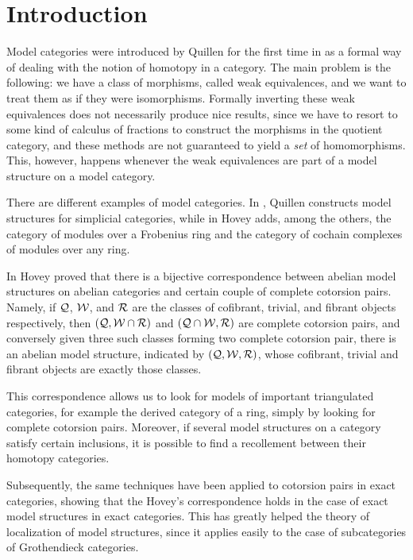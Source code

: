 \chapter*{Introduction}\label{ch:introduction}

Model categories were introduced by Quillen for the first time in \cite{Q} as a formal way of dealing with the notion of homotopy in a category. The main problem is the following: we have a class of morphisms, called weak equivalences, and we want to treat them as if they were isomorphisms. Formally inverting these weak equivalences does not necessarily produce nice results, since we have to resort to some kind of calculus of fractions to construct the morphisms in the quotient category, and these methods are not guaranteed to yield a \emph{set} of homomorphisms. This, however, happens whenever the weak equivalences are part of a model structure on a model category.

There are different examples of model categories. In \cite{Q}, Quillen constructs model structures for simplicial categories, while in \cite{Hov99} Hovey adds, among the others, the category of modules over a Frobenius ring and the category of cochain complexes of modules over any ring.

In \cite{Hov02} Hovey proved that there is a bijective correspondence between abelian model structures on abelian categories and certain couple of complete cotorsion pairs. Namely, if $\mathcal{Q}$, $\mathcal{W}$, and $\mathcal{R}$ are the classes of cofibrant, trivial, and fibrant objects respectively, then $(\mathcal{Q},\mathcal{W}\cap\mathcal{R})$ and $(\mathcal{Q}\cap\mathcal{W},\mathcal{R})$ are complete cotorsion pairs, and conversely given three such classes forming two complete cotorsion pair, there is an abelian model structure, indicated by $(\mathcal{Q},\mathcal{W},\mathcal{R})$, whose cofibrant, trivial and fibrant objects are exactly those classes.

This correspondence allows us to look for models of important triangulated categories, for example the derived category of a ring, simply by looking for complete cotorsion pairs. Moreover, if several model structures on a category satisfy certain inclusions, it is possible to find a recollement between their homotopy categories.

Subsequently, the same techniques have been applied to cotorsion pairs in exact categories, showing that the Hovey's correspondence holds in the case of exact model structures in exact categories. This has greatly helped the theory of localization of model structures, since it applies easily to the case of subcategories of Grothendieck categories.

